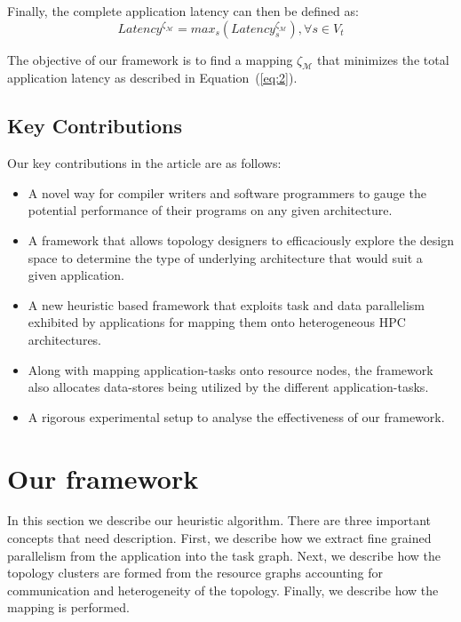 \documentclass[10pt, conference, compsocconf]{IEEEtran}
\begin{document}
Finally, the complete application latency can then be defined as: 
\begin{equation}
  \label{eq:2}
  Latency^{\zeta_\mathcal{M}} = max_{s}
  ({Latency^{\zeta_\mathcal{M}}_s}), \forall s \in V_t
\end{equation}

The objective of our framework is to find a mapping $\zeta_\mathcal{M}$
that minimizes the total application latency as described in
Equation~(\ref{eq:2}).

\subsection{Key Contributions}
Our key contributions in the article are as follows:
\begin{itemize}
\item A novel way for compiler writers and software programmers to gauge
  the potential performance of their programs on any given architecture.
\item A framework that allows topology designers to efficaciously
  explore the design space to determine the type of underlying
  architecture that would suit a given application.
\item A new heuristic based framework that exploits task and data
  parallelism exhibited by applications for mapping them onto
  heterogeneous HPC architectures.
\item Along with mapping application-tasks onto resource nodes, the
  framework also allocates data-stores being utilized by the different
  application-tasks.
\item A rigorous experimental setup to analyse the effectiveness of our
  framework.
\end{itemize}

\section{Our framework}
\label{sec:our-framework}

In this section we describe our heuristic algorithm. There are three
important concepts that need description. First, we describe how we
extract fine grained parallelism from the application into the task
graph. Next, we describe how the topology clusters are formed from the
resource graphs accounting for communication and heterogeneity of the
topology. Finally, we describe how the mapping is performed.


\end{document}
